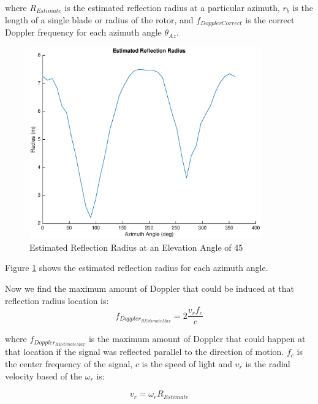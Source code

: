 where $R_{Estimate}$ is the estimated reflection radius at a particular azimuth, $r_b$ is the length of a single blade or radius of the rotor, and $f_{DopplerCorrect}$ is the correct Doppler frequency for each azimuth angle $\theta_{Az}$.

\begin{figure}
	\begin{center}
		\includegraphics[width=10cm]{images/results/Estimated_reflection_radius_Azimuth_range.eps}
		\caption{Estimated Reflection Radius at an Elevation Angle of 45\textdegree}
		\label{fig:est_radius_azimuth_range}
	\end{center}
\end{figure}

Figure \ref{fig:est_radius_azimuth_range} shows the estimated reflection radius for each azimuth angle.

Now we find the maximum amount of Doppler that could be induced at that reflection radius location is:
\begin{equation}
	f_{Doppler_{R Estimate Max}} = 2\frac{v_r f_c}{c}
	\label{eqn:max_doppler}
\end{equation}

where $f_{Doppler_{R Estimate Max}}$ is the maximum amount of Doppler that could happen at that location if the signal was reflected parallel to the direction of motion. $f_c$ is the center frequency of the signal, $c$ is the speed of light and $v_r$ is the radial velocity based of the $\omega_r$ is:

\begin{equation}
	v_r = \omega_r R_{Estimate}
	\label{eqn:v_radial}
\end{equation}


